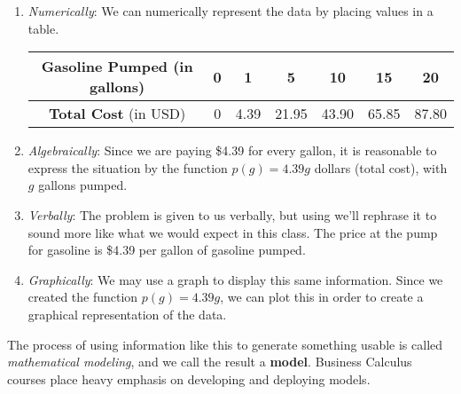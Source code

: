 \documentclass[notes]{subfiles}
\begin{document}
			\begin{enumerate}[(1)]
				\item \emph{Numerically}: We can numerically represent the data by placing values in a table.
					\begin{center}
						{\renewcommand{\arraystretch}{1.2}
						\begin{tabular}{|c||c|c|c|c|c|c|}\hline
							\textbf{Gasoline Pumped} (in gallons) & 0 & 1 & 5 & 10 & 15 & 20 \\ \hline
							\textbf{Total Cost} (in USD) & 0 & 4.39 & 21.95 & 43.90 & 65.85 & 87.80\\ \hline
						\end{tabular}
						}
					\end{center}
						 
				\item \emph{Algebraically}: 
					Since we are paying \$4.39 for every gallon, it is reasonable to express the situation by the function $p(g) = 4.39g$ dollars (total cost), with $g$ gallons pumped.
										
				\item \emph{Verbally}: 
					The problem is given to us verbally, but using we'll rephrase it to sound more like what we would expect in this class.  The price at the pump for gasoline is \$4.39 per gallon of gasoline pumped.
				
				\item \emph{Graphically}: 
					We may use a graph to display this same information.  Since we created the function $p(g) = 4.39g$, we can plot this in order to create a graphical representation of the data.  
					\begin{center}
					\end{center}
			\end{enumerate}
	
		\noindent The process of using information like this to generate something usable is called \emph{mathematical modeling}, and we call the result a \textbf{model}.  Business Calculus courses place heavy emphasis on developing and deploying models. 
		 
\end{document}
